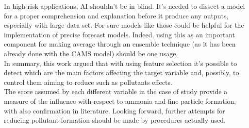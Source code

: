 In high-risk applications, AI shouldn't be in blind. 
It's needed to dissect a model for a proper comprehension and explanation before it produce any outputs, especially with large data set.
For sure models like those could be helpful for the implementation of precise forecast models. Indeed, using this as an important component for making average through an ensemble technique (as it has been already done with the CAMS model) should be one usage.
\\
In summary, this work argued that with using feature selection it's possible to detect which are the main factors affecting the target variable and, possibly, to control them aiming to reduce such as pollutants effects.\\
The score assumed by each different variable in the case of study provide a measure of the influence with respect to ammonia and fine particle formation, with also confirmation in literature.
Looking forward, further attempts for reducing pollutant formation should be made by procedures actually used.

